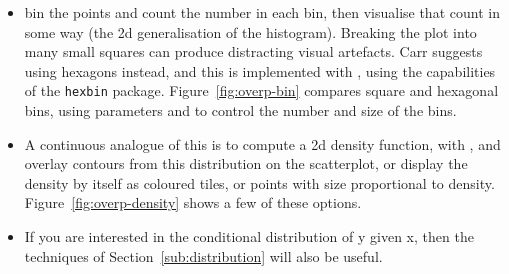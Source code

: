 \begin{itemize}
  \item bin the points and count the number in each bin, then visualise that count in some way (the 2d generalisation of the histogram).  Breaking the plot into many small squares can produce distracting visual artefacts.  Carr \citep{carr:1987} suggests using hexagons instead, and this is implemented with , using the capabilities of the {\tt hexbin} \cite{hexbin} package.  Figure~\ref{fig:overp-bin} compares square and hexagonal bins, using parameters  and  to control the number and size of the bins.
  
    
  
  \item A continuous analogue of this is to compute a 2d density function, with , and overlay contours from this distribution on the scatterplot, or display the density by itself as coloured tiles, or points with size proportional to density.  Figure~\ref{fig:overp-density} shows a few of these options.
  
    
  
  \item If you are interested in the conditional distribution of y given x, then the techniques of Section~\ref{sub:distribution} will also be useful.
  
\end{itemize}

